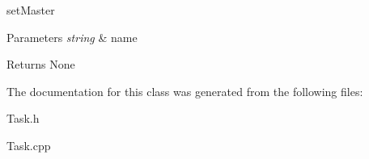 set\+Master 
\begin{DoxyParams}{Parameters}
{\em string} & name \\
\hline
\end{DoxyParams}
\begin{DoxyReturn}{Returns}
None 
\end{DoxyReturn}


The documentation for this class was generated from the following files\+:\begin{DoxyCompactItemize}
\item 
Task.\+h\item 
Task.\+cpp\end{DoxyCompactItemize}

